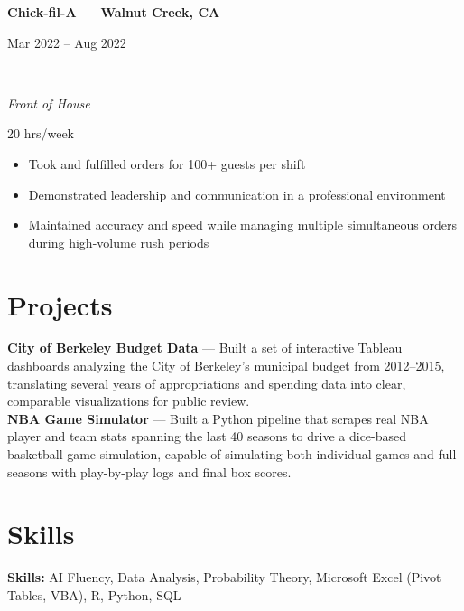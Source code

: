 \documentclass[11pt,letterpaper]{article}
\newcommand{\jobentry}[4]{%
  \noindent\begin{minipage}[t]{0.72\textwidth}\raggedright\textbf{#1}\end{minipage}%
  \hfill\begin{minipage}[t]{0.26\textwidth}\raggedleft\small\color{gray}#2\end{minipage}\\
  \begin{minipage}[t]{0.72\textwidth}\raggedright\textit{#3}\end{minipage}%
  \hfill\begin{minipage}[t]{0.26\textwidth}\raggedleft\small\color{gray}#4\end{minipage}\par\vspace{2pt}
}
\begin{document}
\jobentry{Chick-fil-A --- Walnut Creek, CA}{Mar 2022 -- Aug 2022}{Front of House}{20 hrs/week}
\begin{itemize}
  \item Took and fulfilled orders for 100+ guests per shift
  \item Demonstrated leadership and communication in a professional environment
  \item Maintained accuracy and speed while managing multiple simultaneous orders during high-volume rush periods
\end{itemize}

\section*{Projects}
\textbf{City of Berkeley Budget Data} --- Built a set of interactive Tableau dashboards analyzing the City of Berkeley's municipal budget from 2012--2015, translating several years of appropriations and spending data into clear, comparable visualizations for public review.\\[4pt]
\textbf{NBA Game Simulator} --- Built a Python pipeline that scrapes real NBA player and team stats spanning the last 40 seasons to drive a dice-based basketball game simulation, capable of simulating both individual games and full seasons with play-by-play logs and final box scores.

\section*{Skills}
\textbf{Skills:} AI Fluency, Data Analysis, Probability Theory, Microsoft Excel (Pivot Tables, VBA), R, Python, SQL
\end{document}
